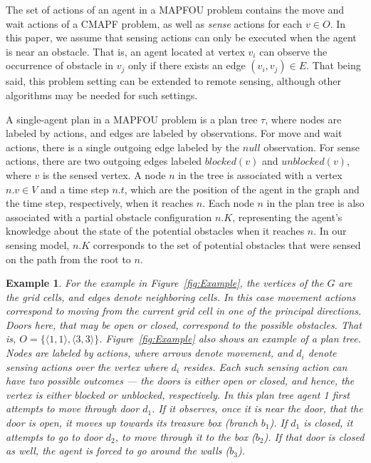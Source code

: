 \documentclass[letterpaper]{article} %
\newcommand{\blocked}{\textit{blocked}}
\newcommand{\unblocked}{\textit{unblocked}}
\newcommand{\roni}[1]{{\textcolor{green}{[Roni: #1]}}}
\newtheorem{exmp}{Example}
\begin{document}
The set of actions of an agent in a MAPFOU problem contains the move and wait actions of a CMAPF problem, as well as \emph{sense} actions for each $v \in O$. 
In this paper, we assume that sensing actions can only be executed when the agent is near an obstacle. That is, an agent located at vertex $v_i$ can observe the occurrence of obstacle in $v_j$ only if there exists an edge $(v_i, v_j) \in E$. That being said, this problem setting can be extended to remote sensing, although other algorithms may be needed for such settings.

A single-agent plan in a MAPFOU problem is a plan tree $\tau$, where nodes are labeled by actions, and edges are labeled by observations. For move and wait actions, there is a single outgoing edge labeled by the $null$ observation. For sense actions, there are two outgoing edges labeled $\blocked(v)$ and $\unblocked(v)$, where $v$ is the sensed vertex. 
A node $n$ in the tree is associated with a vertex $n.v \in V$ and a time step $n.t$, which are the position of the agent in the graph and the time step, respectively, when it reaches $n$. 
Each node $n$ in the plan tree is also associated with a partial obstacle configuration $n.K$, representing the agent's knowledge about the state of the potential obstacles when it reaches $n$. In our sensing model, $n.K$ corresponds to the set of potential obstacles that were sensed on the path from the root to $n$. 

\begin{exmp}
For the example in Figure~\ref{fig:Example}, the vertices of the $G$ are the grid cells, and edges denote neighboring cells. In this case movement actions correspond to moving from the current grid cell in one of the principal directions. 
Doors here, that may be open or closed, correspond to the possible obstacles. That is, $O=\{ \langle 1,1 \rangle, \langle 3,3 \rangle \}$. 
Figure~\ref{fig:Example} also shows an example of a plan tree. Nodes are labeled by actions, where arrows denote movement, and $d_i$ denote sensing actions over the vertex where $d_i$ resides. Each such sensing action can have two possible outcomes --- the doors is either open or closed, and hence, the vertex is either blocked or unblocked, respectively.
In this plan tree agent 1 first attempts to move through door $d_1$. If it observes, once it is near the door, that the door is open, it moves up towards its treasure box (branch $b_1$). If $d_1$ is closed, it attempts to go to door $d_2$, to move through it to the box ($b_2$). If that door is closed as well, the agent is forced to go around the walls ($b_3$).  
\end{exmp}
\end{document}
